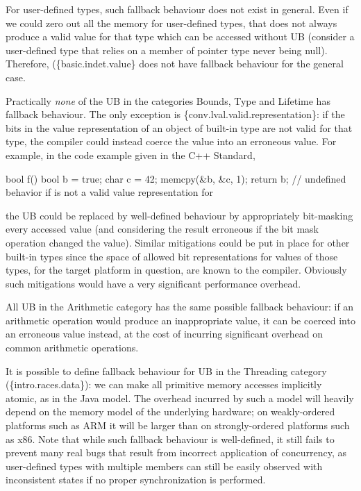 For user-defined types, such fallback behaviour does not exist in general. Even if we could zero out all the memory for user-defined types, that does not always produce a valid value for that type which can be accessed without UB (consider a user-defined type that relies on a member of pointer type never being null). Therefore, (\{basic.indet.value\} does not have fallback behaviour for the general case.

Practically \emph{none} of the UB in the categories Bounds, Type and Lifetime has fallback behaviour. The only exception is \{conv.lval.valid.representation\}: if the bits in the value representation of an object of built-in type are not valid for that type, the compiler could instead coerce the value into an erroneous value. For example, in the code example given in the C++ Standard,

\begin{codeblock}
bool f() {
  bool b = true;
  char c = 42;
  memcpy(&b, &c, 1);
  return b;         // undefined behavior if  is not a valid value representation for 
}
\end{codeblock}

the UB could be replaced by well-defined behaviour by appropriately bit-masking every accessed  value (and considering the result erroneous if the bit mask operation changed the value). Similar mitigations could be put in place for other built-in types since the space of allowed bit representations for values of those types, for the target platform in question, are known to the compiler. Obviously such mitigations would have a very significant performance overhead.

All UB in the Arithmetic category has the same possible fallback behaviour: if an arithmetic operation would produce an inappropriate value, it can be coerced into an erroneous value instead, at the cost of incurring significant overhead on common arithmetic operations.

It is possible to define fallback behaviour for UB in the Threading category (\{intro.races.data\}): we can make all primitive memory accesses implicitly atomic, as in the Java model. The overhead incurred by such a model will heavily depend on the memory model of the underlying hardware; on weakly-ordered platforms such as ARM it will be larger than on strongly-ordered platforms such as x86. Note that while such fallback behaviour is well-defined, it still fails to prevent many real bugs that result from incorrect application of concurrency, as user-defined types with multiple members can still be easily observed with inconsistent states if no proper synchronization is performed.

